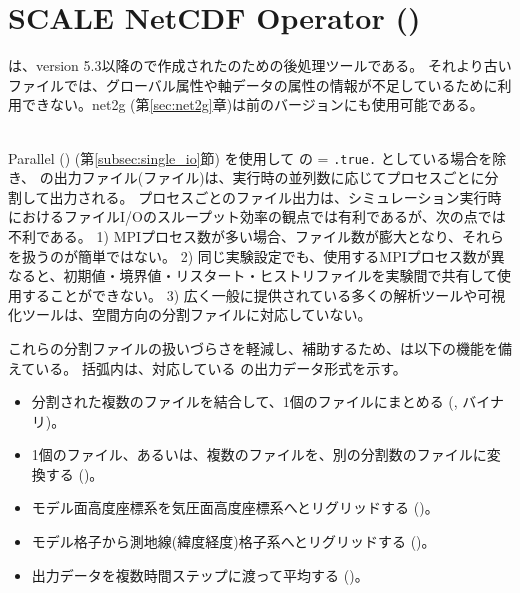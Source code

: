 \section{SCALE NetCDF Operator (\sno)} \label{sec:sno}

 \hrulefill

\sno は、version 5.3以降の\scalelib で作成された\scalenetcdf のための後処理ツールである。
それより古い \scalenetcdf ファイルでは、グローバル属性や軸データの属性の情報が不足しているために利用できない。net2g (第\ref{sec:net2g}章)は前のバージョンにも使用可能である。

\hrulefill\\


Parallel \netcdf (\pnetcdf) (第\ref{subsec:single_io}節) を使用して
 の  = \verb|.true.| としている場合を除き、
\scalerm の出力ファイル(\scalenetcdf ファイル)は、実行時の並列数に応じてプロセスごとに分割して出力される。
プロセスごとのファイル出力は、シミュレーション実行時におけるファイルI/Oのスループット効率の観点では有利であるが、次の点では不利である。
1) MPIプロセス数が多い場合、ファイル数が膨大となり、それらを扱うのが簡単ではない。
2) 同じ実験設定でも、使用するMPIプロセス数が異なると、初期値・境界値・リスタート・ヒストリファイルを実験間で共有して使用することができない。
3) 広く一般に提供されている多くの解析ツールや可視化ツールは、空間方向の分割ファイルに対応していない。

これらの分割ファイルの扱いづらさを軽減し、補助するため、\sno は以下の機能を備えている。
括弧内は、対応している \sno の出力データ形式を示す。
\begin{itemize}
 \item 分割された複数のファイルを結合して、1個のファイルにまとめる (\scalenetcdf, \grads バイナリ)。
 \item 1個のファイル、あるいは、複数のファイルを、別の分割数のファイルに変換する (\scalenetcdf)。
 \item モデル面高度座標系を気圧面高度座標系へとリグリッドする (\scalenetcdf)。
 \item モデル格子から測地線(緯度経度)格子系へとリグリッドする (\scalenetcdf)。
 \item 出力データを複数時間ステップに渡って平均する (\scalenetcdf)。
\end{itemize}


